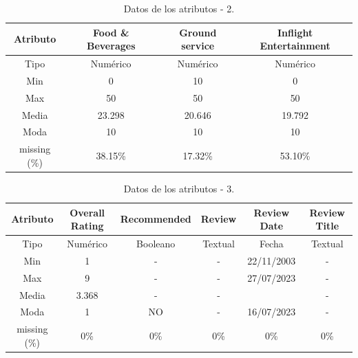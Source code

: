 \documentclass[es]{uc3mreport}
\begin{document}
\begin{report}
\begin{table}[H]
    \center
    \begin{tabular}{@{}cccc@{}}
        \toprule
        Atributo     & Food \& Beverages & Ground service & Inflight Entertainment \\
        \midrule
        Tipo         & Numérico          & Numérico       & Numérico               \\
        Min          & 0                 & 10             & 0                      \\
        Max          & 50                & 50             & 50                     \\
        Media        & 23.298            & 20.646         & 19.792                 \\
        Moda         & 10                & 10             & 10                     \\
        missing (\%) & 38.15\%           & 17.32\%        & 53.10\%                \\
        \bottomrule
    \end{tabular}
    \caption{Datos de los atributos - 2.}
\end{table}
\begin{table}[H]
    \center
    \begin{tabular}{@{}cccccc@{}}
        \toprule
        Atributo     & Overall Rating  & Recommended & Review  & Review Date & Review Title \\
        \midrule
        Tipo         & Numérico        & Booleano    & Textual & Fecha       & Textual      \\
        Min          & 1               & -           & -       & 22/11/2003  & -            \\
        Max          & 9               & -           & -       & 27/07/2023  & -            \\
        Media        & 3.368           & -           & -       &             & -            \\
        Moda         & 1               & NO          & -       & 16/07/2023  & -            \\
        missing (\%) & 0\%             & 0\%         & 0\%     & 0\%         & 0\%          \\
        \bottomrule
    \end{tabular}
    \caption{Datos de los atributos - 3.}
\end{table}
\begin{table}[H]
    \center
    \begin{tabular}{@{}ccccc@{}}

\end{tabular}
\end{table}
\end{report}
\end{document}
